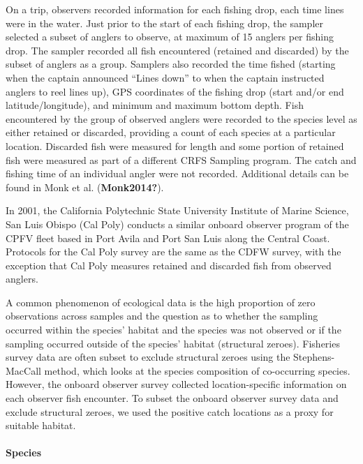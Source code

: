\documentclass[]{elsarticle} %
\begin{document}
On a trip, observers recorded information for each fishing drop, each
time lines were in the water. Just prior to the start of each fishing
drop, the sampler selected a subset of anglers to observe, at maximum of
15 anglers per fishing drop. The sampler recorded all fish encountered
(retained and discarded) by the subset of anglers as a group. Samplers
also recorded the time fished (starting when the captain announced
``Lines down'' to when the captain instructed anglers to reel lines up),
GPS coordinates of the fishing drop (start and/or end
latitude/longitude), and minimum and maximum bottom depth. Fish
encountered by the group of observed anglers were recorded to the
species level as either retained or discarded, providing a count of each
species at a particular location. Discarded fish were measured for
length and some portion of retained fish were measured as part of a
different CRFS Sampling program. The catch and fishing time of an
individual angler were not recorded. Additional details can be found in
Monk et al. (\textbf{Monk2014?}).

In 2001, the California Polytechnic State University Institute of Marine
Science, San Luis Obispo (Cal Poly) conducts a similar onboard observer
program of the CPFV fleet based in Port Avila and Port San Luis along
the Central Coast. Protocols for the Cal Poly survey are the same as the
CDFW survey, with the exception that Cal Poly measures retained and
discarded fish from observed anglers.

A common phenomenon of ecological data is the high proportion of zero
observations across samples and the question as to whether the sampling
occurred within the species' habitat and the species was not observed or
if the sampling occurred outside of the species' habitat (structural
zeroes). Fisheries survey data are often subset to exclude structural
zeroes using the Stephens-MacCall method, which looks at the species
composition of co-occurring species. However, the onboard observer
survey collected location-specific information on each observer fish
encounter. To subset the onboard observer survey data and exclude
structural zeroes, we used the positive catch locations as a proxy for
suitable habitat.

\hypertarget{species}{%
\paragraph{Species}\label{species}}
\end{document}
